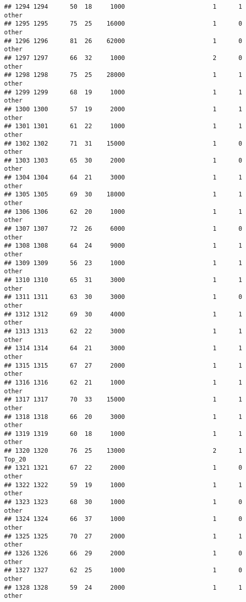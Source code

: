\documentclass[
]{article}
\begin{document}
\begin{verbatim}
## 1294 1294      50  18     1000                        1      1    other
## 1295 1295      75  25    16000                        1      0    other
## 1296 1296      81  26    62000                        1      0    other
## 1297 1297      66  32     1000                        2      0    other
## 1298 1298      75  25    28000                        1      1    other
## 1299 1299      68  19     1000                        1      1    other
## 1300 1300      57  19     2000                        1      1    other
## 1301 1301      61  22     1000                        1      1    other
## 1302 1302      71  31    15000                        1      0    other
## 1303 1303      65  30     2000                        1      0    other
## 1304 1304      64  21     3000                        1      1    other
## 1305 1305      69  30    18000                        1      1    other
## 1306 1306      62  20     1000                        1      1    other
## 1307 1307      72  26     6000                        1      0    other
## 1308 1308      64  24     9000                        1      1    other
## 1309 1309      56  23     1000                        1      1    other
## 1310 1310      65  31     3000                        1      1    other
## 1311 1311      63  30     3000                        1      0    other
## 1312 1312      69  30     4000                        1      1    other
## 1313 1313      62  22     3000                        1      1    other
## 1314 1314      64  21     3000                        1      1    other
## 1315 1315      67  27     2000                        1      1    other
## 1316 1316      62  21     1000                        1      1    other
## 1317 1317      70  33    15000                        1      1    other
## 1318 1318      66  20     3000                        1      1    other
## 1319 1319      60  18     1000                        1      1    other
## 1320 1320      76  25    13000                        2      1   Top_20
## 1321 1321      67  22     2000                        1      0    other
## 1322 1322      59  19     1000                        1      1    other
## 1323 1323      68  30     1000                        1      0    other
## 1324 1324      66  37     1000                        1      0    other
## 1325 1325      70  27     2000                        1      1    other
## 1326 1326      66  29     2000                        1      0    other
## 1327 1327      62  25     1000                        1      0    other
## 1328 1328      59  24     2000                        1      1    other

\end{verbatim}
\end{document}
